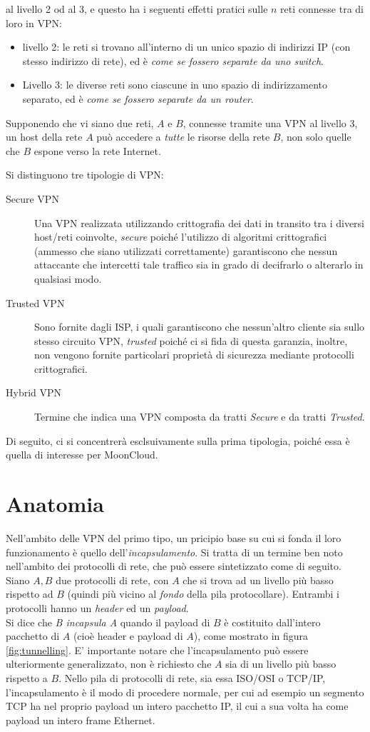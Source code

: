 al livello 2 od al 3, e questo ha i seguenti effetti pratici sulle $n$ reti connesse
tra di loro in VPN:
\begin{itemize}
	\item livello 2: le reti si trovano all'interno di un unico spazio di indirizzi IP
	      (con stesso indirizzo di rete), ed è \textit{come se fossero separate da uno switch}.
	\item Livello 3: le diverse reti sono ciascune in uno spazio di indirizzamento separato,
	      ed è \textit{come se fossero separate da un router}.
\end{itemize}
Supponendo che vi siano due reti, $A$ e $B$, connesse tramite una VPN al livello 3,
un host della rete $A$ può accedere a \textit{tutte} le risorse della rete $B$,
non solo quelle che $B$ espone verso la rete Internet.


Si distinguono tre tipologie di VPN:
\begin{description}
	\item[Secure VPN]Una VPN realizzata utilizzando crittografia dei dati in transito
	tra i diversi host/reti coinvolte, \textit{secure} poiché l'utilizzo di algoritmi
	crittografici (ammesso che siano utilizzati correttamente) garantiscono che nessun
	attaccante che intercetti tale traffico sia in grado di decifrarlo o alterarlo in
	qualsiasi modo.
	\item[Trusted VPN]Sono fornite dagli ISP, i quali garantiscono che nessun'altro
	cliente sia sullo stesso circuito VPN, \textit{trusted} poiché ci si fida di
	questa garanzia, inoltre, non vengono fornite particolari proprietà di sicurezza
	mediante protocolli crittografici.
	\item[Hybrid VPN]Termine che indica una VPN composta da tratti \textit{Secure}
	e da tratti \textit{Trusted}.
\end{description}
Di seguito, ci si concentrerà esclsuivamente sulla prima tipologia, poiché essa è
quella di interesse per MoonCloud.


\section{Anatomia}
Nell'ambito delle VPN del primo tipo, un pricipio base su cui si fonda il loro
funzionamento è quello dell'\textit{incapsulamento}. Si tratta di un termine
ben noto nell'ambito dei protocolli di rete, che può essere sintetizzato come
di seguito. Siano $A, B$ due protocolli di rete, con $A$ che si trova ad un livello
più basso rispetto ad $B$ (quindi più vicino al \textit{fondo} della pila
protocollare). Entrambi i protocolli hanno un \textit{header} ed un
\textit{payload}.\\
Si dice che \textit{B incapsula A} quando il payload di $B$ è costituito dall'intero
pacchetto di $A$ (cioè header e payload di $A$), come mostrato in figura \ref{fig:tunnelling}.
E' importante notare che l'incapsulamento può essere ulteriormente generalizzato,
non è richiesto che $A$ sia di un livello più basso rispetto a $B$. Nello pila
di protocolli di rete, sia essa ISO/OSI o TCP/IP, l'incapsulamento è il modo di
procedere normale, per cui ad esempio un segmento TCP ha nel proprio payload
un intero pacchetto IP, il cui a sua volta ha come payload un intero frame Ethernet.


